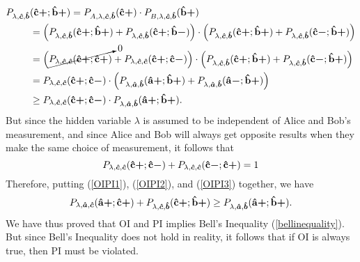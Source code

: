 \begin{equation}\label{OIPI2}
\begin{split}
 P_{\lambda,\bm{\hat{c}},\bm{\hat{b}}}&(\vb{\hat{{c}}}\bm{+};\vb{\hat{{b}}}\bm{+})=P_{A,\lambda,\bm{\hat{c}},\bm{\hat{b}}}(\vb{\hat{{c}}}\bm{+})\cdot P_{B,\lambda,\bm{\hat{c}},\bm{\hat{b}}}(\vb{\hat{{b}}}\bm{+})\\
 &= \Big( P_{\lambda,\bm{\hat{c}},\bm{\hat{b}}}(\vb{\hat{{c}}}\bm{+};\vb{\hat{{b}}}\bm{+})+ P_{\lambda,\bm{\hat{c}},\bm{\hat{b}}}(\vb{\hat{{c}}}\bm{+};\vb{\hat{{b}}}\bm{-})\Big)\cdot\Big( P_{\lambda,\bm{\hat{c}},\bm{\hat{b}}}(\vb{\hat{{c}}}\bm{+};\vb{\hat{{b}}}\bm{+})+ P_{\lambda,\bm{\hat{c}},\bm{\hat{b}}}(\vb{\hat{{c}}}\bm{-};\vb{\hat{{b}}}\bm{+})\Big)\\
 &= \Big(  \cancelto{0}{P_{\lambda,\bm{\hat{c}},\bm{\hat{c}}}(\vb{\hat{{c}}}\bm{+};\vb{\hat{{c}}}\bm{+})}+ P_{\lambda,\bm{\hat{c}},\bm{\hat{c}}}(\vb{\hat{{c}}}\bm{+};\vb{\hat{{c}}}\bm{-})\Big)\cdot\Big(P_{\lambda,\bm{\hat{c}},\bm{\hat{b}}}(\vb{\hat{{c}}}\bm{+};\vb{\hat{{b}}}\bm{+})+ P_{\lambda,\bm{\hat{c}},\bm{\hat{b}}}(\vb{\hat{{c}}}\bm{-};\vb{\hat{{b}}}\bm{+})\Big)\\
 &=P_{\lambda,\bm{\hat{c}},\bm{\hat{c}}}(\vb{\hat{{c}}}\bm{+};\vb{\hat{{c}}}\bm{-})\cdot\Big( P_{\lambda,\bm{\hat{a}},\bm{\hat{b}}}(\vb{\hat{{a}}}\bm{+};\vb{\hat{{b}}}\bm{+})+ P_{\lambda,\bm{\hat{a}},\bm{\hat{b}}}(\vb{\hat{{a}}}\bm{-};\vb{\hat{{b}}}\bm{+})\Big)\\
 &\geq P_{\lambda,\bm{\hat{c}},\bm{\hat{c}}}(\vb{\hat{{c}}}\bm{+};\vb{\hat{{c}}}\bm{-})\cdot P_{\lambda,\bm{\hat{a}},\bm{\hat{b}}}(\vb{\hat{{a}}}\bm{+};\vb{\hat{{b}}}\bm{+}) .
\end{split}
\end{equation}
But since the hidden variable $\lambda$ is assumed to be independent of Alice and Bob's measurement, and since Alice and Bob will always get opposite results when they make the same choice of measurement, it follows that 
\begin{equation}\label{OIPI3}
P_{\lambda,\bm{\hat{c}},\bm{\hat{c}}}(\vb{\hat{{c}}}\bm{+};\vb{\hat{{c}}}\bm{-})+P_{\lambda,\bm{\hat{c}},\bm{\hat{c}}}(\vb{\hat{{c}}}\bm{-};\vb{\hat{{c}}}\bm{+})=1
\end{equation}
Therefore, putting (\ref{OIPI1}), (\ref{OIPI2}), and (\ref{OIPI3}) together, we have
\begin{equation}
P_{\lambda,\bm{\hat{a}},\bm{\hat{c}}}(\vb{\hat{{a}}}\bm{+};\vb{\hat{{c}}}\bm{+})+P_{\lambda,\bm{\hat{c}},\bm{\hat{b}}}(\vb{\hat{{c}}}\bm{+};\vb{\hat{{b}}}\bm{+})\geq P_{\lambda,\bm{\hat{a}},\bm{\hat{b}}}(\vb{\hat{{a}}}\bm{+};\vb{\hat{{b}}}\bm{+}).
\end{equation}
We have thus proved that OI and PI implies Bell's Inequality (\ref{bellinequality}). But since Bell's Inequality does not hold in reality, it follows that if OI is always true, then PI must be violated.


